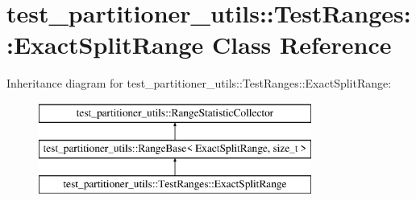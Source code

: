 \hypertarget{classtest__partitioner__utils_1_1TestRanges_1_1ExactSplitRange}{}\section{test\+\_\+partitioner\+\_\+utils\+:\+:Test\+Ranges\+:\+:Exact\+Split\+Range Class Reference}
\label{classtest__partitioner__utils_1_1TestRanges_1_1ExactSplitRange}
Inheritance diagram for test\+\_\+partitioner\+\_\+utils\+:\+:Test\+Ranges\+:\+:Exact\+Split\+Range\+:\begin{figure}[H]
\begin{center}
\leavevmode
\includegraphics[height=3.000000cm]{classtest__partitioner__utils_1_1TestRanges_1_1ExactSplitRange}
\end{center}
\end{figure}
